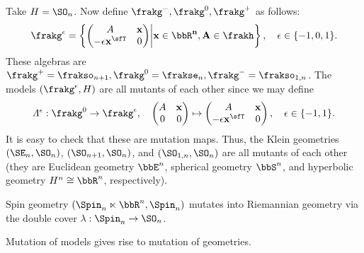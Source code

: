 \begin{example}
    Take $H=\SO_n$. Now define $\frakg^-,\frakg^0,\frakg^+$ as follows:
    \[\frakg^\epsilon=\left\{
        \begin{pmatrix}
            A & \bf{x}\\
            -\epsilon\bf{x}^\sfT  & 0
        \end{pmatrix}\middle| \bf{x}\in\bbR^n,A\in\frakh
    \right\},\quad \epsilon\in \{-1,0,1\}.\]
    These algebras are $\frakg^+=\frakso_{n+1},\frakg^0=\frakse_n,\frakg^-=\frakso_{1,n}$. The models $(\frakg^\epsilon,H)$ are all mutants of each other since we may define 
    \[\varLambda^\epsilon:\frakg^0\to \frakg^\epsilon,\quad 
    \begin{pmatrix}
        A & \bf{x}\\
        0 & 0
\end{pmatrix}\mapsto 
\begin{pmatrix}
    A & \bf{x}\\
    -\epsilon\bf{x}^\sfT  & 0
\end{pmatrix},\quad \epsilon\in\{-1,1\}.
    \]
    It is easy to check that these are mutation maps. Thus, the Klein geometries $(\SE_n,\SO_n)$, $(\SO_{n+1},\SO_n)$, and $(\SO_{1,n},\SO_n)$ are all mutants of each other (they are Euclidean geometry $\bbE^n$, spherical geometry $\bbS^n$, and hyperbolic geometry $H^n\cong\bbR^n$, respectively).
\end{example}

\begin{example}
    Spin geometry $(\Spin_{n}\ltimes\bbR^n,\Spin_n)$ mutates into Riemannian geometry via the double cover $\lambda:\Spin_n\to \SO_n$.
\end{example}


Mutation of models gives rise to mutation of geometries.

